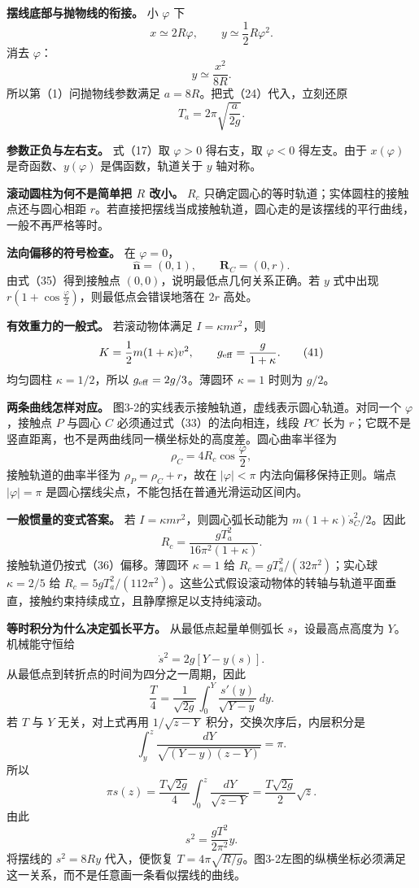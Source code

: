 \documentclass[12pt,a4paper,UTF8]{ctexart}
\begin{document}
\textbf{摆线底部与抛物线的衔接。} 小 \(\varphi\) 下 \[
x\simeq2R\varphi,\qquad
y\simeq\frac12R\varphi^2. \tag{38}
\] 消去 \(\varphi\)： \[
y\simeq\frac{x^2}{8R}. \tag{39}
\] 所以第（1）问抛物线参数满足 \(a=8R\)。把式（24）代入，立刻还原 \[
T_a=2\pi\sqrt{\frac{a}{2g}}.
\]

\textbf{参数正负与左右支。} 式（17）取 \(\varphi>0\) 得右支，取
\(\varphi<0\) 得左支。由于 \(x(\varphi)\) 是奇函数、\(y(\varphi)\)
是偶函数，轨道关于 \(y\) 轴对称。

\textbf{滚动圆柱为何不是简单把 \(R\) 改小。} \(R_c\)
只确定圆心的等时轨道；实体圆柱的接触点还与圆心相距
\(r\)。若直接把摆线当成接触轨道，圆心走的是该摆线的平行曲线，一般不再严格等时。

\textbf{法向偏移的符号检查。} 在 \(\varphi=0\)， \[
\hat{\bm n}=(0,1),\qquad
\bm R_C=(0,r). \tag{40}
\] 由式（35）得到接触点 \((0,0)\)，说明最低点几何关系正确。若 \(y\)
式中出现 \(r(1+\cos\frac\varphi2)\)，则最低点会错误地落在 \(2r\) 高处。

\textbf{有效重力的一般式。} 若滚动物体满足 \(I=\kappa mr^2\)，则 \[
K=\frac12m(1+\kappa)v^2, \qquad
g_{\rm eff}=\frac{g}{1+\kappa}. \tag{41}
\] 均匀圆柱 \(\kappa=1/2\)，所以 \(g_{\rm eff}=2g/3\)。薄圆环
\(\kappa=1\) 时则为 \(g/2\)。

\textbf{两条曲线怎样对应。}
图3-2的实线表示接触轨道，虚线表示圆心轨道。对同一个 \(\varphi\)，接触点
\(P\) 与圆心 \(C\) 必须通过式（33）的法向相连，线段 \(PC\) 长为
\(r\)；它既不是竖直距离，也不是两曲线同一横坐标处的高度差。圆心曲率半径为
\[
\rho_C=4R_c\cos\frac\varphi2,
\] 接触轨道的曲率半径为 \(\rho_P=\rho_C+r\)，故在 \(|\varphi|<\pi\)
内法向偏移保持正则。端点 \(|\varphi|=\pi\)
是圆心摆线尖点，不能包括在普通光滑运动区间内。

\textbf{一般惯量的变式答案。} 若 \(I=\kappa mr^2\)，则圆心弧长动能为
\(m(1+\kappa)\dot s_C^2/2\)。因此 \[
R_c=\frac{gT_a^2}{16\pi^2(1+\kappa)}.
\] 接触轨道仍按式（36）偏移。薄圆环 \(\kappa=1\) 给
\(R_c=gT_a^2/(32\pi^2)\)；实心球 \(\kappa=2/5\) 给
\(R_c=5gT_a^2/(112\pi^2)\)。这些公式假设滚动物体的转轴与轨道平面垂直，接触约束持续成立，且静摩擦足以支持纯滚动。

\textbf{等时积分为什么决定弧长平方。} 从最低点起量单侧弧长
\(s\)，设最高点高度为 \(Y\)。机械能守恒给 \[
\dot s^2=2g[Y-y(s)].
\] 从最低点到转折点的时间为四分之一周期，因此 \[
\frac T4=\frac1{\sqrt{2g}}\int_0^Y\frac{s'(y)}{\sqrt{Y-y}}\,dy.
\] 若 \(T\) 与 \(Y\) 无关，对上式再用 \(1/\sqrt{z-Y}\)
积分，交换次序后，内层积分是 \[
\int_y^z\frac{dY}{\sqrt{(Y-y)(z-Y)}}=\pi.
\] 所以 \[
\pi s(z)=\frac{T\sqrt{2g}}4\int_0^z\frac{dY}{\sqrt{z-Y}}
=\frac{T\sqrt{2g}}2\sqrt z.
\] 由此 \[
s^2=\frac{gT^2}{2\pi^2}y.
\] 将摆线的 \(s^2=8Ry\) 代入，便恢复
\(T=4\pi\sqrt{R/g}\)。图3-2左图的纵横坐标必须满足这一关系，而不是任意画一条看似摆线的曲线。
\end{document}
